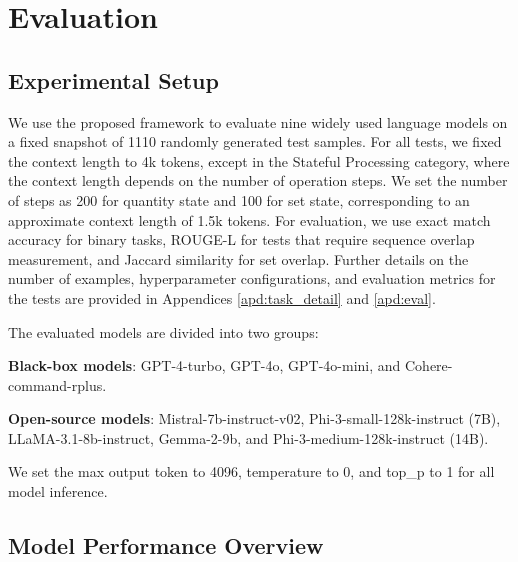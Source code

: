 \section{Evaluation}
% 

\subsection{Experimental Setup}
We use the proposed framework to evaluate nine widely used language models on a fixed snapshot of 1110 randomly generated test samples. For all tests, we fixed the context length to 4k tokens, except in the Stateful Processing category, where the context length depends on the number of operation steps. We set the number of steps as 200 for quantity state and 100 for set state, corresponding to an approximate context length of 1.5k tokens. For evaluation, we use exact match accuracy for binary tasks, ROUGE-L\citep{lin-2004-rouge} for tests that require sequence overlap measurement, and Jaccard similarity \citep{jaccard1901etude} for set overlap. Further details on the number of examples, hyperparameter configurations, and evaluation metrics for the tests are provided in Appendices \ref{apd:task_detail} and \ref{apd:eval}.

The evaluated models are divided into two groups: 

\textbf{Black-box models}: GPT-4-turbo, GPT-4o, GPT-4o-mini, and Cohere-command-rplus. 

\textbf{Open-source models}: Mistral-7b-instruct-v02, Phi-3-small-128k-instruct (7B), LLaMA-3.1-8b-instruct, Gemma-2-9b, and Phi-3-medium-128k-instruct (14B).

We set the max output token to 4096, temperature to 0, and top\_p to 1 for all model inference.



\subsection{Model Performance Overview}

